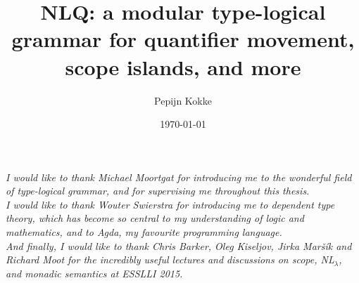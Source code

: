 \documentclass[a4paper]{article}
\title{NLQ: a modular type-logical grammar for quantifier movement,
  scope islands, and more}
\author{Pepijn Kokke}
\date{\today}
\begin{document}
\clearpage

\vspace*{\fill}
\begin{center}\itshape
  \noindent
  I would like to thank Michael Moortgat for introducing me to the
  wonderful field of type-logical grammar, and for supervising me
  throughout this thesis.
  \\[1\baselineskip]

  \noindent
  I would like to thank Wouter Swierstra for introducing me to
  dependent type theory, which has become so central to my
  understanding of logic and mathematics, and to Agda, my favourite
  programming language.
  \\[1\baselineskip]

  \noindent
  And finally, I would like to thank Chris Barker, Oleg Kiseljov,
  Jirka Maršík and Richard Moot for the incredibly useful lectures and
  discussions on scope, NL$_{\lambda}$, and monadic semantics at
  ESSLLI 2015.
  \\[1\baselineskip]
\end{center}
\vspace*{\fill}
\tableofcontents
\clearpage







\clearpage
{}

%

\renewcommand\thesection{A}

\renewcommand\thesection{B}

\end{document}
